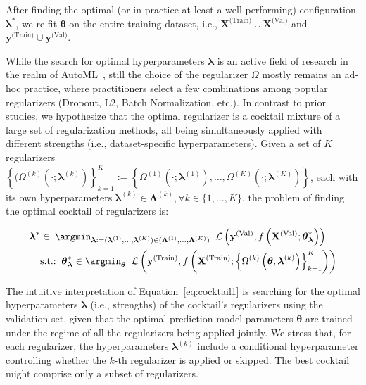 After finding the optimal (or in practice at least a well-performing) configuration $\boldsymbol{\lambda}^*$, we re-fit $\boldsymbol{\theta}$ on the entire training dataset, i.e., $\mathbf{X}^{\text{(Train)}} \cup \mathbf{X}^{\text{(Val)}}$ and $\mathbf{y}^{\text{(Train)}} \cup \mathbf{y}^{\text{(Val)}}$.

While the search for optimal hyperparameters $\boldsymbol{\lambda}$ is an active field of research in the realm of AutoML~\citep{automl_book}, still the choice of the regularizer $\Omega$ mostly remains an ad-hoc practice, where practitioners select a few combinations among popular regularizers (Dropout, L2, Batch Normalization, etc.). In contrast to prior studies, we hypothesize that the optimal regularizer is a cocktail mixture of a large set of regularization methods, all being simultaneously applied with different strengths (i.e., dataset-specific hyperparameters). Given a set of $K$ regularizers $\left\{(\Omega^{(k)}\left(\cdot; \boldsymbol{\lambda}^{(k)}\right)\right\}_{k=1}^{K}:= \left\{\Omega^{(1)}\left(\cdot; \boldsymbol{\lambda}^{(1)}\right), \dots, \Omega^{(K)}\left(\cdot; \boldsymbol{\lambda}^{(K)}\right) \right\}$, each with its own hyperparameters $\boldsymbol{\lambda}^{(k)}\in \boldsymbol{\Lambda}^{(k)}, \forall k \in \{1,\dots,K\}$, the problem of finding the optimal cocktail of regularizers is:

\begin{align}
\label{eq:cocktail1}
\boldsymbol{\lambda}^* &\in \;  \argmin_{\boldsymbol{\lambda}:=(\boldsymbol{\lambda}^{(1)}, \dots,  \boldsymbol{\lambda}^{(K)}) \in (\boldsymbol{\Lambda}^{(1)}, \dots,  \boldsymbol{\Lambda}^{(K)})} \;\; \mathcal{L}\left(\mathbf{y}^{\text{(Val)}}, f\left(\mathbf{X}^{\text{(Val)}}; \boldsymbol{\theta}^{*}_{\boldsymbol{\lambda}} \right) \right) \\ \nonumber
&\text{s.t.:} \;\; {\boldsymbol{\theta}^{*}_{\boldsymbol{\lambda}}} \in \argmin_{\boldsymbol{\theta}} \;\; \mathcal{L}\left(\mathbf{y}^{\text{(Train)}},  f\left(\mathbf{X}^{\text{(Train)}}; \left\{\Omega^{(k)}\left(\boldsymbol{\theta}, \boldsymbol{\lambda}^{(k)}\right)\right\}_{k=1}^{K} \right)\right)
\label{eq:cocktail2}
\end{align}

The intuitive interpretation of Equation~\ref{eq:cocktail1} is searching for the optimal hyperparameters $\boldsymbol{\lambda}$ (i.e., strengths) of the cocktail's regularizers using the validation set, given that the optimal prediction model parameters $\boldsymbol{\theta}$ are trained under the regime of all the regularizers being applied jointly. We stress that, for each regularizer, the hyperparameters $\boldsymbol{\lambda}^{(k)}$ include a conditional hyperparameter controlling whether the $k$-th regularizer is applied or skipped. The best cocktail might comprise only a subset of regularizers. 

